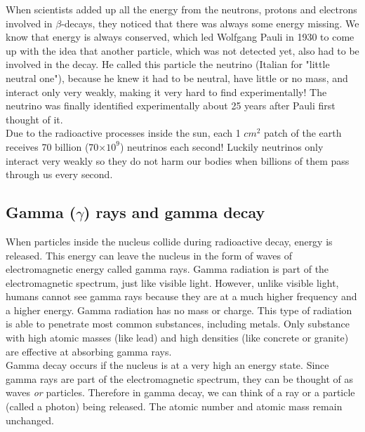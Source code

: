 \begin{IFact}{
When scientists added up all the energy from the neutrons, protons and electrons involved in $\beta$-decays, they noticed that there was always some energy missing. We know that energy is always conserved, which led Wolfgang Pauli in 1930 to come up with the idea that another particle, which was not detected yet, also had to be involved in the decay. He called this particle the neutrino (Italian for "little neutral one"), because he knew it had to be neutral, have little or no mass, and interact only very weakly, making it very hard to find experimentally! The neutrino was finally identified experimentally about 25 years after Pauli first thought of it.\\

Due to the radioactive processes inside the sun, each 1 $cm^{2}$ patch of the earth receives 70 billion (70$\times 10^{9}$) neutrinos each second! Luckily neutrinos only interact very weakly so they do not harm our bodies when billions of them pass through us every second.
}
\end{IFact}

\subsection{Gamma ($\gamma$) rays and gamma decay}

When particles inside the nucleus collide during radioactive decay, energy is released. This energy can leave the nucleus in the form of waves of electromagnetic energy called gamma rays. Gamma radiation is part of the electromagnetic spectrum, just like visible light. However, unlike visible light, humans cannot see gamma rays because they are at a much higher frequency and a higher energy. Gamma radiation has no mass or charge. This type of radiation is able to penetrate most common substances, including metals. Only substance with high atomic masses (like lead) and high densities (like concrete or granite) are effective at absorbing gamma rays.\\

Gamma decay occurs if the nucleus is at a very high an energy state. Since gamma rays are part of the electromagnetic spectrum, they can be thought of as waves \emph{or} particles. Therefore in gamma decay, we can think of a ray or a particle (called a photon) being released. The atomic number and atomic mass remain unchanged.

